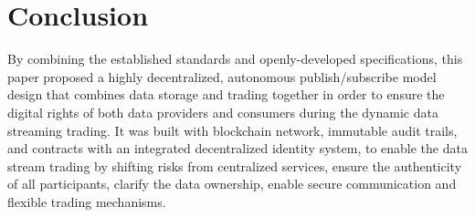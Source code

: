 \documentclass[conference]{IEEEtran}
\begin{document}
\begin{table}[h]
	\caption{Data Price Estimation}
	\label{tab:ether}
	\centering
\end{table}

\section{Conclusion}
\label{section:conclusion}
By combining the established standards and openly-developed specifications, this paper proposed a highly decentralized, autonomous publish/subscribe model design that combines data storage and trading together in order to ensure the digital rights of both data providers and consumers during the dynamic data streaming trading. It was built with blockchain network, immutable audit trails, and contracts with an integrated decentralized identity system, to enable the data stream trading by shifting risks from centralized services, ensure the authenticity of all participants, clarify the data ownership, enable secure communication and flexible trading mechanisms.
\end{document}
